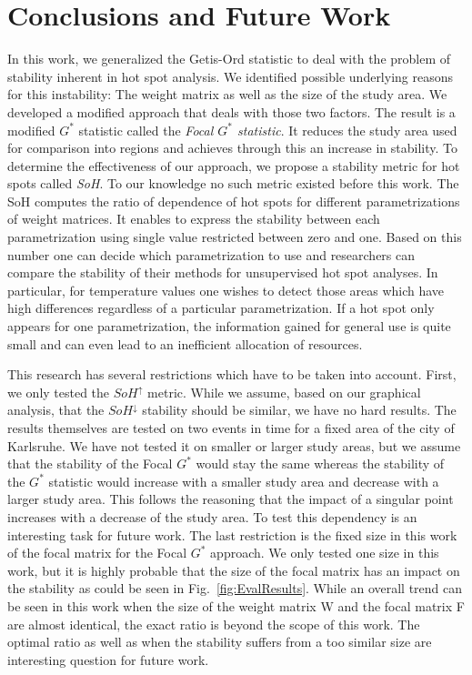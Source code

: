 \documentclass{itatnew}
\begin{document}
\section{Conclusions and Future Work} \label{sec:Conclusion}

In this work, we generalized the Getis-Ord statistic to deal with the problem of
stability inherent in hot spot analysis. We identified possible underlying
reasons for this instability: The weight matrix as well as the size of the study
area. We developed a modified approach that deals with those two factors. The
result is a modified $G^*$ statistic called the \emph{Focal $G^*$ statistic}. It
reduces the study area used for comparison into regions and achieves through
this an increase in stability. To determine the effectiveness of our approach,
we propose a stability metric for hot spots called \emph{SoH}. To our knowledge
no such metric existed before this work. The SoH computes the ratio of
dependence of hot spots for different parametrizations of weight matrices. It
enables to express the stability between each parametrization using single value
restricted between zero and one. Based on this number one can decide which
parametrization to use and researchers can compare the stability of their
methods for unsupervised hot spot analyses. In particular, for temperature
values one wishes to detect those areas which have high differences regardless
of a particular parametrization. If a hot spot only appears for one
parametrization, the information gained for general use is quite small and can
even lead to an inefficient allocation of resources.

This research has several restrictions which have to be taken into account.
First, we only tested the $SoH^\uparrow$ metric. While we assume, based on our
graphical analysis, that the  $SoH^\downarrow$ stability should be similar, we
have no hard results. The results themselves are tested on two events in time
for a fixed area of the city of Karlsruhe. We have not tested it on smaller or
larger study areas, but we assume that the stability of the Focal $G^*$ would
stay the same whereas the stability of the $G^*$ statistic would increase with a
smaller study area and decrease with a larger study area. This follows the
reasoning that the impact of a singular point increases with a decrease of the
study area. To test this dependency is an interesting task for future work. The
last restriction is the fixed size in this work of the focal matrix for the
Focal $G^*$ approach. We only tested one size in this work, but it is highly
probable that the size of the focal matrix has an impact on the stability as
could be seen in Fig.~\ref{fig:EvalResults}. While an overall trend can be seen
in this work when the size of the weight matrix W and the focal matrix F are
almost identical, the exact ratio is beyond the scope of this work. The optimal
ratio as well as when the stability suffers from a too similar size are
interesting question for future work.
\end{document}
